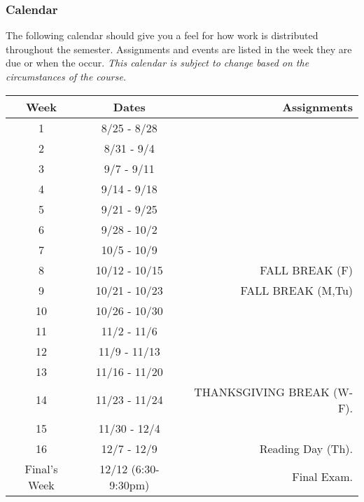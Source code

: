 \documentclass[10pt]{article}
\begin{document}
\subsubsection{Calendar}

The following calendar should give you a feel for how work is distributed throughout the semester.  Assignments and events are listed in the week they are due or when the occur. \textit{This calendar is subject to change based on the circumstances of the course.}

\begin{center}
\begin{tabular}{|c|c|r|}
\hline 
Week & Dates & Assignments \\
\hline
1 & 8/25 - 8/28 &  \\
\hline 
2 & 8/31 - 9/4 &   \\
\hline
3 & 9/7 - 9/11 &   \\
\hline
4 & 9/14 - 9/18 &   \\
\hline
5 & 9/21 - 9/25 &  \\
\hline
6 & 9/28 - 10/2 & \\
\hline
7 & 10/5 - 10/9  &  \\
\hline 
8 & 10/12 - 10/15 &  FALL BREAK (F) \\
\hline
9 & 10/21 - 10/23 & FALL BREAK (M,Tu) \\
\hline
10 & 10/26 - 10/30 &  \\
\hline
11 & 11/2 - 11/6 & \\
\hline
12 & 11/9 - 11/13 &  \\
\hline
13 & 11/16 - 11/20 & \\
\hline
14 & 11/23 - 11/24 &  THANKSGIVING BREAK (W-F).   \\
\hline
15 & 11/30 - 12/4 & \\ 
\hline
16 & 12/7 - 12/9 &   Reading Day (Th). \\
\hline
Final's Week & 12/12 (6:30-9:30pm) & Final Exam. \\ 
\hline
\end{tabular}
\end{center}
\end{document}

